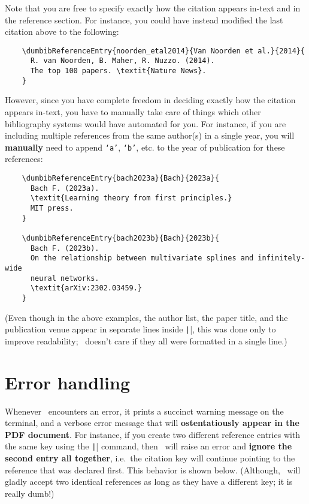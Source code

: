 \documentclass[letter, 12pt]{article}
\begin{document}
  Note that you are free to specify exactly how the citation appears in-text and in the reference section. For instance, you could have instead modified the last citation above to the following:
  \begin{verbatim}
    \dumbibReferenceEntry{noorden_etal2014}{Van Noorden et al.}{2014}{
      R. van Noorden, B. Maher, R. Nuzzo. (2014).
      The top 100 papers. \textit{Nature News}.
    }
  \end{verbatim}
  However, since you have complete freedom in deciding exactly how the citation appears in-text, you have to manually take care of things which other bibliography systems would have automated for you. For instance, if you are including multiple references from the same author(s) in a single year, you will \textbf{manually} need to append \texttt{`a'}, \texttt{`b'}, etc. to the year of publication for these references:
  \begin{verbatim}
    \dumbibReferenceEntry{bach2023a}{Bach}{2023a}{
      Bach F. (2023a).
      \textit{Learning theory from first principles.}
      MIT press.
    }
    
    \dumbibReferenceEntry{bach2023b}{Bach}{2023b}{
      Bach F. (2023b).
      On the relationship between multivariate splines and infinitely-wide
      neural networks.
      \textit{arXiv:2302.03459.}
    }
  \end{verbatim}
  (Even though in the above examples, the author list, the paper title, and the publication venue appear in separate lines inside \texttt|\dumbibReferenceEntry{}|, this was done only to improve readability; \dumbib\ doesn't care if they all were formatted in a single line.) 
  
  
  
  \section{Error handling}
  Whenever \dumbib\ encounters an error, it prints a succinct warning message on the terminal, and a verbose error message that will \textbf{ostentatiously appear in the PDF document}. For instance, if you create two different reference entries with the same key using the \texttt|\dumbibReferenceEntry{}| command, then \dumbib\ will raise an error and \textbf{ignore the second entry all together}, i.e.\ the citation key will continue pointing to the reference that was declared first. This behavior is shown below. (Although, \dumbib\ will gladly accept two identical references as long as they have a different key; it is really dumb!)
\end{document}
